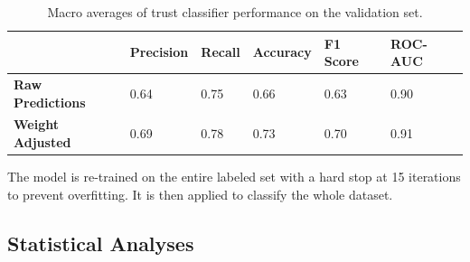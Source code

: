 \documentclass[11pt]{article}
\begin{document}
\begin{table}[htbp]
    \centering
    \renewcommand{\arraystretch}{1.5}
    \begin{tabular}{|l|l|l|l|l|l|}
        \hline
        \textbf{} & \textbf{Precision} & \textbf{Recall} & \textbf{Accuracy} & \textbf{F1 Score} & \textbf{ROC-AUC} \\
        \hline
        \textbf{Raw Predictions} & 0.64 & 0.75 & 0.66 & 0.63 & 0.90 \\
        \hline
        \textbf{Weight Adjusted} & 0.69 & 0.78 & 0.73 & 0.70 & 0.91 \\
        \hline
    \end{tabular}
    \caption{Macro averages of trust classifier performance on the validation set.}
    \label{tab:trust_stats}
\end{table}

The model is re-trained on the entire labeled set with a hard stop at 15 iterations to prevent overfitting. It is then applied to classify the whole dataset.

\subsection{Statistical Analyses}
\end{document}
